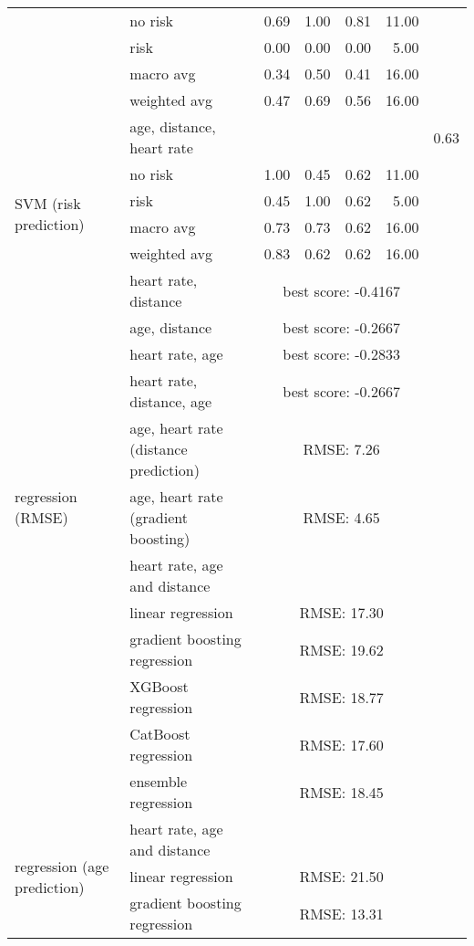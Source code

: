 \begin{longtable}{llrrrrr}
    & no risk & 0.69 & 1.00 & 0.81 & 11.00 & \\
    & risk & 0.00 & 0.00 & 0.00 & 5.00 & \\
    & macro avg & 0.34 & 0.50 & 0.41 & 16.00 & \\
    & weighted avg & 0.47 & 0.69 & 0.56 & 16.00 & \\
    \midrule
    \multirow{6}{*}{SVM (risk prediction)} 
    & age, distance, heart rate & & & & & 0.63 \\
    & no risk & 1.00 & 0.45 & 0.62 & 11.00 & \\
    & risk & 0.45 & 1.00 & 0.62 & 5.00 & \\
    & macro avg & 0.73 & 0.73 & 0.62 & 16.00 & \\
    & weighted avg & 0.83 & 0.62 & 0.62 & 16.00 & \\
    \midrule
    \multirow{4}{*}{optimization (RF)} 
    & heart rate, distance & \multicolumn{4}{c}{best score: -0.4167} & \\
    & age, distance & \multicolumn{4}{c}{best score: -0.2667} & \\
    & heart rate, age & \multicolumn{4}{c}{best score: -0.2833} & \\
    & heart rate, distance, age & \multicolumn{4}{c}{best score: -0.2667} & \\
    \midrule
    \multirow{3}{*}{regression (RMSE)} 
    & age, heart rate (distance prediction) & \multicolumn{4}{c}{RMSE: 7.26} & \\
    & age, heart rate (gradient boosting) & \multicolumn{4}{c}{RMSE: 4.65} & \\
    \midrule
    \multirow{6}{*}{regression (heart rate prediction)} 
    & heart rate, age and distance & \\
    & linear regression & \multicolumn{4}{c}{RMSE: 17.30} & \\
    & gradient boosting regression& \multicolumn{4}{c}{RMSE: 19.62} & \\
    & XGBoost regression & \multicolumn{4}{c}{RMSE: 18.77} & \\
    & CatBoost regression & \multicolumn{4}{c}{RMSE: 17.60} & \\
    & ensemble regression & \multicolumn{4}{c}{RMSE: 18.45} & \\
    \midrule
    \multirow{6}{*}{regression (age prediction)}
    & heart rate, age and distance &   \\
    & linear regression & \multicolumn{4}{c}{RMSE: 21.50} & \\
    & gradient boosting regression & \multicolumn{4}{c}{RMSE: 13.31} & \\

\end{longtable}
